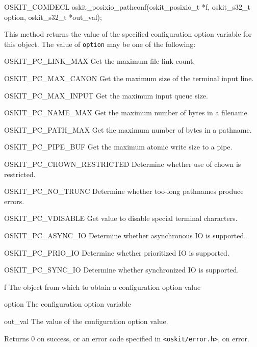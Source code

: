 \begin{apisyn}

	\funcproto OSKIT_COMDECL
	oskit_posixio_pathconf(oskit_posixio_t *f, 
			      oskit_s32_t option,
			      \outparam oskit_s32_t *out_val);
\end{apisyn}
\begin{apidesc}
	This method returns the value of the specified 
	configuration option variable for this object.
	The value of {\tt option} may be one of the following: 
\begin{icsymlist}
\item[OSKIT_PC_LINK_MAX]
	Get the maximum file link count.
\item[OSKIT_PC_MAX_CANON]
	Get the maximum size of the terminal input line.
\item[OSKIT_PC_MAX_INPUT]
	Get the maximum input queue size.
\item[OSKIT_PC_NAME_MAX]
	Get the maximum number of bytes in a filename.
\item[OSKIT_PC_PATH_MAX]
	Get the maximum number of bytes in a pathname.
\item[OSKIT_PC_PIPE_BUF]
	Get the maximum atomic write size to a pipe.
\item[OSKIT_PC_CHOWN_RESTRICTED]
	Determine whether use of chown is restricted.
\item[OSKIT_PC_NO_TRUNC]
	Determine whether too-long pathnames produce errors.
\item[OSKIT_PC_VDISABLE]
	Get value to disable special terminal characters.
\item[OSKIT_PC_ASYNC_IO]
	Determine whether asynchronous IO is supported.
\item[OSKIT_PC_PRIO_IO]
	Determine whether prioritized IO is supported.
\item[OSKIT_PC_SYNC_IO]
	Determine whether synchronized IO is supported.
\end{icsymlist}
\end{apidesc}
\begin{apiparm}
	\item[f]
		The object from which to obtain a configuration option value
	\item[option]
		The configuration option variable
	\item[out_val]
		The value of the configuration option value.
\end{apiparm}
\begin{apiret}
	Returns 0 on success, or an error code specified in
	{\tt <oskit/error.h>}, on error.
\end{apiret}


